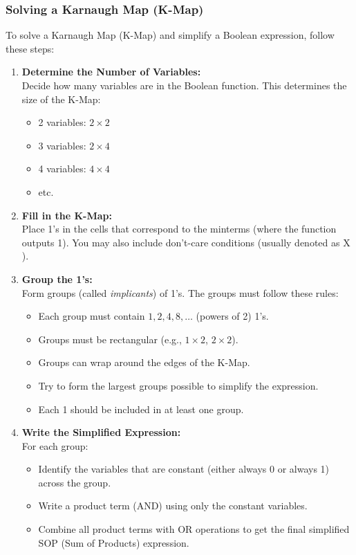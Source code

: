\subsubsection{Solving a Karnaugh Map (K-Map)}

To solve a Karnaugh Map (K-Map) and simplify a Boolean expression, follow these steps:

\begin{enumerate}
	\item \textbf{Determine the Number of Variables:} \\
	      Decide how many variables are in the Boolean function. This determines the size of the K-Map:
	      \begin{itemize}[label=\(-\)]
		      \item 2 variables: \(2 \times 2\)
		      \item 3 variables: \(2 \times 4\)
		      \item 4 variables: \(4 \times 4\)
		      \item etc.
	      \end{itemize}

	\item \textbf{Fill in the K-Map:} \\
	      Place 1's in the cells that correspond to the minterms (where the function outputs 1). You may also include don't-care conditions (usually denoted as \(\)X\(\)).

	\item \textbf{Group the 1's:} \\
	      Form groups (called \emph{implicants}) of 1's. The groups must follow these rules:
	      \begin{itemize}[label=\(-\)]
		      \item Each group must contain \(1, 2, 4, 8, \ldots\) (powers of 2) 1's.
		      \item Groups must be rectangular (e.g., \(1 \times 2\), \(2 \times 2\)).
		      \item Groups can wrap around the edges of the K-Map.
		      \item Try to form the largest groups possible to simplify the expression.
		      \item Each 1 should be included in at least one group.
	      \end{itemize}

	\item \textbf{Write the Simplified Expression:} \\
	      For each group:
	      \begin{itemize}[label=\(-\)]
		      \item Identify the variables that are constant (either always 0 or always 1) across the group.
		      \item Write a product term (AND) using only the constant variables.
		      \item Combine all product terms with OR operations to get the final simplified SOP (Sum of Products) expression.
	      \end{itemize}
\end{enumerate}

